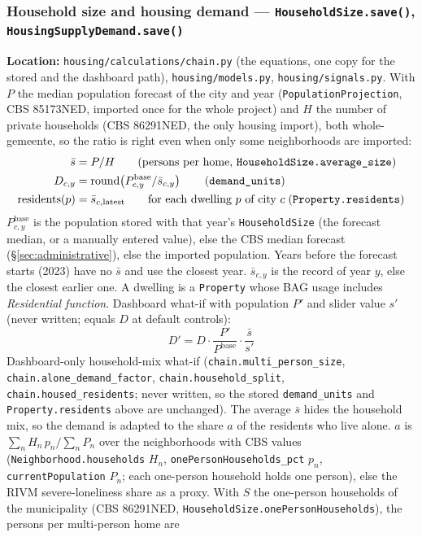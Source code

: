 \documentclass[11pt]{article}
\newcommand{\code}[1]{\texttt{#1}}
\begin{document}
\subsubsection{Household size and housing demand --- \code{HouseholdSize.save()}, \code{HousingSupplyDemand.save()}}
\label{sec:household-size}
\textbf{Location:} \code{housing/calculations/chain.py} (the equations, one copy for the stored and the dashboard path), \code{housing/models.py}, \code{housing/signals.py}. With $P$ the median population forecast of the city and year (\code{PopulationProjection}, CBS 85173NED, imported once for the whole project) and $H$ the number of private households (CBS 86291NED, the only housing import), both whole-gemeente, so the ratio is right even when only some neighborhoods are imported:
\begin{align}
  \bar{s} &= P / H \qquad \text{(persons per home, \code{HouseholdSize.average\_size})} \\
  D_{c,y} &= \operatorname{round}\!\left(P^{\text{base}}_{c,y} / \bar{s}_{c,y}\right) \qquad \text{(\code{demand\_units})} \\
  \text{residents}(p) &= \bar{s}_{c,\text{latest}} \qquad \text{for each dwelling } p \text{ of city } c \;(\code{Property.residents})
\end{align}
$P^{\text{base}}_{c,y}$ is the population stored with that year's \code{HouseholdSize} (the forecast median, or a manually entered value), else the CBS median forecast (\S\ref{sec:administrative}), else the imported population. Years before the forecast starts (2023) have no $\bar{s}$ and use the closest year. $\bar{s}_{c,y}$ is the record of year $y$, else the closest earlier one. A dwelling is a \code{Property} whose BAG usage includes \emph{Residential function}. Dashboard what-if with population $P'$ and slider value $s'$ (never written; equals $D$ at default controls):
\begin{equation}
  D' = D \cdot \frac{P'}{P^{\text{base}}} \cdot \frac{\bar{s}}{s'}
\end{equation}
Dashboard-only household-mix what-if (\code{chain.multi\_person\_size}, \code{chain.alone\_demand\_factor}, \code{chain.household\_split}, \code{chain.housed\_residents}; never written, so the stored \code{demand\_units} and \code{Property.residents} above are unchanged). The average $\bar{s}$ hides the household mix, so the demand is adapted to the share $a$ of the residents who live alone. $a$ is $\sum_n H_n\,p_n / \sum_n P_n$ over the neighborhoods with CBS values (\code{Neighborhood.households} $H_n$, \code{onePersonHouseholds\_pct} $p_n$, \code{currentPopulation} $P_n$; each one-person household holds one person), else the RIVM severe-loneliness share as a proxy. With $S$ the one-person households of the municipality (CBS 86291NED, \code{HouseholdSize.onePersonHouseholds}), the persons per multi-person home are
\end{document}
